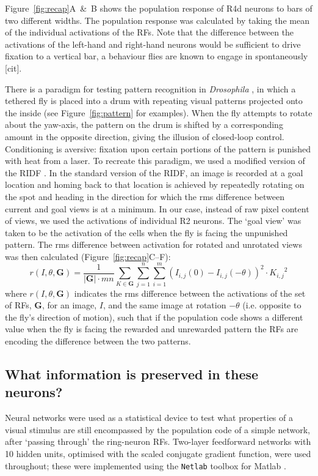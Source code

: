 Figure~\ref{fig:recap}A~\&~B shows the population response of R4d neurons to bars of two different widths.
The population response was calculated by taking the mean of the individual activations of the \acp{RF}.
Note that the difference between the activations of the left-hand and right-hand neurons would be sufficient to drive fixation to a vertical bar, a behaviour flies are known to engage in spontaneously [cit].

There is a paradigm for testing pattern recognition in \emph{Drosophila} \cite{Pan2009,Liu2006,Ernst1999}, in which a tethered fly is placed into a drum with repeating visual patterns projected onto the inside (see Figure~\ref{fig:pattern} for examples).
When the fly attempts to rotate about the yaw-axis, the pattern on the drum is shifted by a corresponding amount in the opposite direction, giving the illusion of closed-loop control.
Conditioning is aversive: fixation upon certain portions of the pattern is punished with heat from a laser.
To recreate this paradigm, we used a modified version of the \ac{RIDF} \cite{Philippides2011,Zeil2003}.
In the standard version of the \ac{RIDF}, an image is recorded at a goal location and homing back to that location is achieved by repeatedly rotating on the spot and heading in the direction for which the \ac{rms} difference between current and goal views is at a minimum.
In our case, instead of raw pixel content of views, we used the activations of individual R2 neurons.
The `goal view' was taken to be the activation of the cells when the fly is facing the unpunished pattern.
The \ac{rms} difference between activation for rotated and unrotated views was then calculated (Figure~\ref{fig:recap}C--F):
$$
r(I,\theta,\mathbf{G}) = \frac{1}{|\mathbf{G}|\cdot mn} {\sum\limits_{K \in \mathbf{G}} \sum\limits^n_{j=1} \sum\limits^m_{i=1} (I_{i,j}(0)-I_{i,j}(-\theta))^2 \cdot {K_{i,j}}^2}
$$
where $r(I,\theta,\mathbf{G})$ indicates the \ac{rms} difference between the activations of the set of \acp{RF}, $\mathbf{G}$, for an image, $I$, and the same image at rotation $-\theta$ (i.e. opposite to the fly's direction of motion), such that if the population code shows a different value when the fly is facing the rewarded and unrewarded pattern the \acp{RF} are encoding the difference between the two patterns.

\subsection*{What information is preserved in these neurons?}
Neural networks were used as a statistical device to test what properties of a visual stimulus are still encompassed by the population code of a simple network, after `passing through' the ring-neuron \acp{RF}.
Two-layer feedforward networks with 10 hidden units, optimised with the scaled conjugate gradient function, were used throughout; these were implemented using the \texttt{Netlab} toolbox for Matlab \cite{netlab}.

